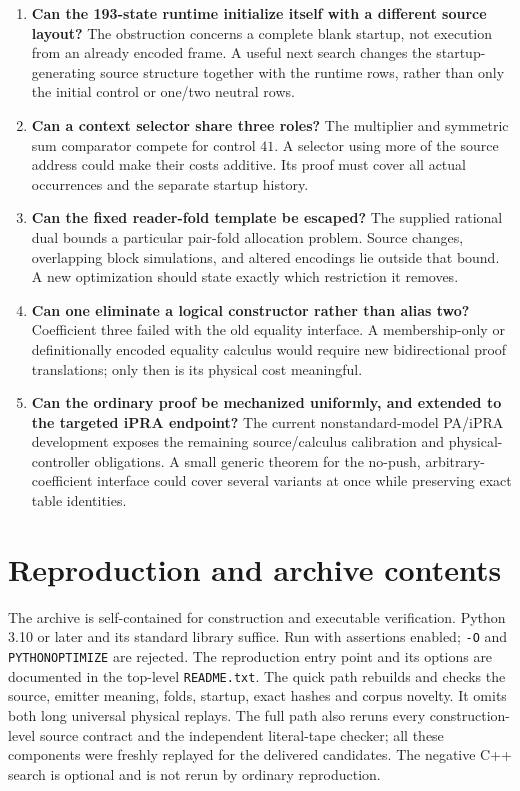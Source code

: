\documentclass[11pt,letterpaper]{article}
\newcommand{\file}[1]{\begingroup\def\UrlBreaks{\do\/\do\_\do\-\do\.}\texttt{\nolinkurl{#1}}\endgroup}
\begin{document}
\begin{enumerate}
\item \textbf{Can the 193-state runtime initialize itself with a different source
layout?} The obstruction concerns a complete blank startup, not execution from
an already encoded frame. A useful next search changes the startup-generating
source structure together with the runtime rows, rather than only the initial
control or one/two neutral rows.
\item \textbf{Can a context selector share three roles?} The multiplier and symmetric
sum comparator compete for control $41$. A selector using more of the source
address could make their costs additive. Its proof must cover all actual
occurrences and the separate startup history.
\item \textbf{Can the fixed reader-fold template be escaped?} The supplied rational
dual bounds a particular pair-fold allocation problem. Source changes,
overlapping block simulations, and altered encodings lie outside that bound.
A new optimization should state exactly which restriction it removes.
\item \textbf{Can one eliminate a logical constructor rather than alias two?}
Coefficient three failed with the old equality interface. A membership-only or
definitionally encoded equality calculus would require new bidirectional proof
translations; only then is its physical cost meaningful.
\item \textbf{Can the ordinary proof be mechanized uniformly, and extended to the
targeted iPRA endpoint?} The current
nonstandard-model PA/iPRA development exposes the remaining source/calculus
calibration and physical-controller obligations. A small generic theorem for
the no-push, arbitrary-coefficient interface could cover several variants at
once while preserving exact table identities.
\end{enumerate}

\section{Reproduction and archive contents}

The archive is self-contained for construction and executable verification.
Python 3.10 or later and its standard library suffice. Run with assertions
enabled; \file{-O} and \file{PYTHONOPTIMIZE} are rejected. The reproduction
entry point and its options are documented in the top-level \file{README.txt}.
The quick path rebuilds and checks the source, emitter meaning, folds, startup,
exact hashes and corpus novelty. It omits both long universal physical replays.
The full path also reruns every construction-level source contract and the
independent literal-tape checker; all these components were freshly replayed
for the delivered candidates. The negative C++ search is optional
and is not rerun by ordinary reproduction.
\end{document}
